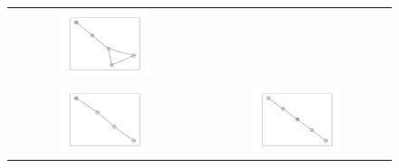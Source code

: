 \documentclass[12pt, a4paper]{extarticle}
\begin{document}
\begin{figure}
\begin{tabularx}{\textwidth}{cc}
\includegraphics[width=0.5\textwidth]{task11-graphlets/5_10-14-16-18-23.pdf} \\
\includegraphics[width=0.5\textwidth]{task11-graphlets/4_21-19-22-23.pdf} &
\includegraphics[width=0.5\textwidth]{task11-graphlets/5_18-25-19-23-26.pdf} \\
\end{tabularx}\end{figure}
\end{document}
